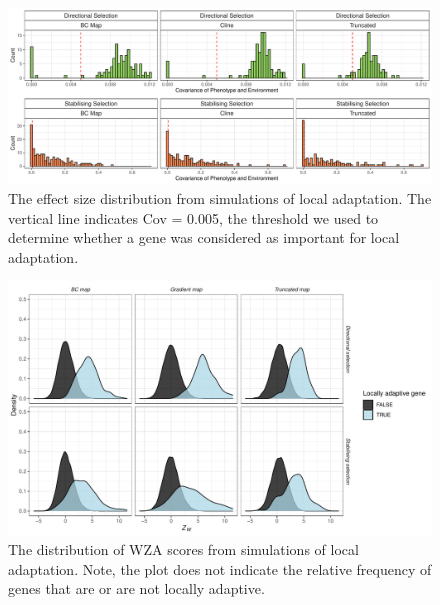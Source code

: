 \documentclass[10pt,twoside,lineno, twocolumn]{GSA_format}
\begin{document}
\pagebreak


\begin{figure}[H]
  \includegraphics[width=\textwidth,height=0.75\textheight,keepaspectratio]{Plots/effectSizeDistributionPlot.pdf}
  \caption{The effect size distribution from simulations of local adaptation. The vertical line indicates Cov = 0.005, the threshold we used to determine whether a gene was considered as important for local adaptation.}

  \label{fig:effectSizeDistribution}
\end{figure}

\pagebreak




\begin{figure}[H]
  \includegraphics[width=\textwidth,height=0.75\textheight,keepaspectratio]{Plots/selectionWZA_plot.pdf}
  \caption{The distribution of WZA scores from simulations of local adaptation. Note, the plot does not indicate the relative frequency of genes that are or are not locally adaptive. }

  \label{fig:ZScoreDistribution}
\end{figure}

\pagebreak
\end{document}

